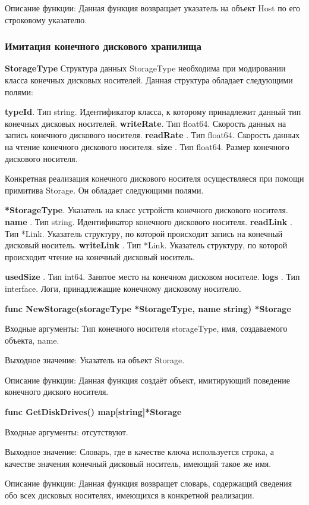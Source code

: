 Описание функции: Данная функция возвращает указатель на объект Host по его строковому указателю.

\subsubsection{Имитация конечного дискового хранилища}
\textbf{StorageType}
Структура данных StorageType необходима при модировании класса конечных дисковых носителей. Данная структура обладает следующими полями:

\textbf{	typeId}. Тип    string. Идентификатор класса, к которому принадлежит данный тип конечных дисковых носителей. 
\textbf{	writeRate}. Тип float64. Скорость данных на запись конечного дискового носителя.
\textbf{	readRate }. Тип float64. Скорость данных на чтение конечного дискового носителя.
\textbf{	size     }. Тип float64. Размер конечного дискового носителя.

Конкретная реализация конечного дискового носителя осуществляеся при помощи примитива Storage. Он обладает следующими полями. 

\textbf{	*StorageType}. Указатель на класс устройств конечного дискового носителя. 
\textbf{	name     }. Тип string. Идентификатор конечного дискового носителя.
\textbf{	readLink }. Тип *Link. Указатель структуру, по которой происходит запись на  конечный дисковый носитель.
\textbf{	writeLink }. Тип *Link. Указатель структуру, по которой происходит чтение на  конечный дисковый носитель.

\textbf{	usedSize }. Тип int64. Занятое место на конечном дисковом носителе.
\textbf{	logs }. Тип interface{}. Логи, принадлежащие конечному дисковому носителю.


\textbf{func NewStorage(storageType *StorageType, name string) *Storage}

Входные аргументы: Тип конечного носителя storageType, имя, создаваемого объекта, name. 

Выходное значение: Указатель на объект Storage. 

Описание функции: Данная функция создаёт объект, имитирующий поведение конечного диского носителя.

\textbf{func GetDiskDrives() map[string]*Storage}

Входные аргументы: отсутствуют.

Выходное значение: Словарь, где в качестве ключа используется строка, а качестве значения конечный дисковый носитель, имеющий такое же имя.

Описание функции: Данная функция возвращет словарь, содержащий сведения обо всех дисковых носителях, имеющихся в конкретной реализации. 

